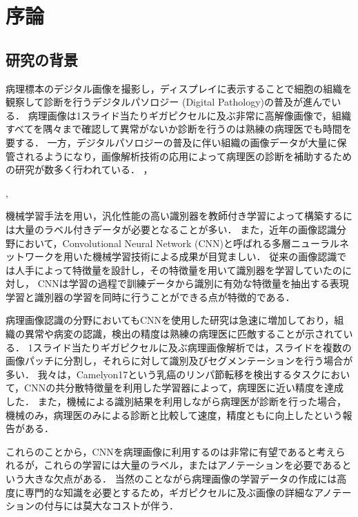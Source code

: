 \chapter{序論}

\section{研究の背景}

病理標本のデジタル画像を撮影し，ディスプレイに表示することで細胞の組織を観察して診断を行うデジタルパソロジー (Digital Pathology)の普及が進んでいる．
病理画像は1スライド当たりギガピクセルに及ぶ非常に高解像画像で，組織すべてを隅々まで確認して異常がないか診断を行うのは熟練の病理医でも時間を要する．
一方，デジタルパソロジーの普及に伴い組織の画像データが大量に保管されるようになり，画像解析技術の応用によって病理医の診断を補助するための研究が数多く行われている．
\cite{gurcan2009histopathological}，


\cite{doyle2008automated}, \cite{dundar2011computerized}

機械学習手法を用い，汎化性能の高い識別器を教師付き学習によって構築するには大量のラベル付きデータが必要となることが多い．
また，近年の画像認識分野において，Convolutional Neural Network (CNN)と呼ばれる多層ニューラルネットワークを用いた機械学習技術による成果が目覚ましい．
従来の画像認識では人手によって特徴量を設計し，その特徴量を用いて識別器を学習していたのに対し，
CNNは学習の過程で訓練データから識別に有効な特徴量を抽出する表現学習と識別器の学習を同時に行うことができる点が特徴的である．

病理画像認識の分野においてもCNNを使用した研究は急速に増加しており，組織の異常や病変の認識，検出の精度は熟練の病理医に匹敵することが示されている．
1スライド当たりギガピクセルに及ぶ病理画像解析では，スライドを複数の画像パッチに分割し，それらに対して識別及びセグメンテーションを行う場合が多い．
我々は，Camelyon17という乳癌のリンパ節転移を検出するタスクにおいて，CNNの共分散特徴量を利用した学習器によって，病理医に近い精度を達成した．
また，機械による識別結果を利用しながら病理医が診断を行った場合，機械のみ，病理医のみによる診断と比較して速度，精度ともに向上したという報告がある．

これらのことから，CNNを病理画像に利用するのは非常に有望であると考えられるが，これらの学習には大量のラベル，またはアノテーションを必要であるという大きな欠点がある．
当然のことながら病理画像の学習データの作成には高度に専門的な知識を必要とするため，ギガピクセルに及ぶ画像の詳細なアノテーションの付与には莫大なコストが伴う．


